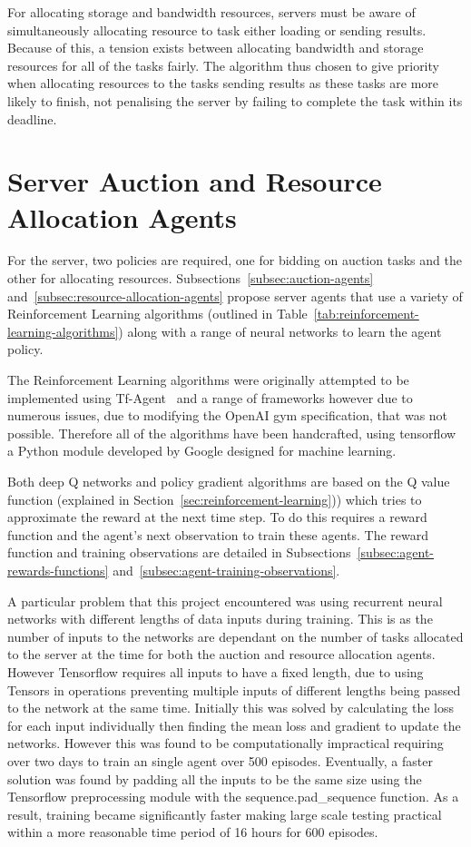 For allocating storage and bandwidth resources, servers must be aware of simultaneously allocating resource to task
either loading or sending results. Because of this, a tension exists between allocating bandwidth and
storage resources for all of the tasks fairly. The algorithm thus chosen to give priority when allocating
resources to the tasks sending results as these tasks are more likely to finish, not penalising the server by failing
to complete the task within its deadline.

\section{Server Auction and Resource Allocation Agents}
\label{sec:server-auction-and-resource-allocation-agents}
For the server, two policies are required, one for bidding on auction tasks and the other for allocating resources.
Subsections~\ref{subsec:auction-agents} and~\ref{subsec:resource-allocation-agents} propose server agents that use
a variety of Reinforcement Learning algorithms (outlined in Table~\ref{tab:reinforcement-learning-algorithms}) along
with a range of neural networks to learn the agent policy.

The Reinforcement Learning algorithms were originally attempted to be implemented using Tf-Agent~\citep{tf-agent} and a
range of frameworks however due to numerous issues, due to modifying the OpenAI gym specification, that was not
possible. Therefore all of the algorithms have been handcrafted, using tensorflow~\citep{tensorflow2015-whitepaper} a
Python module developed by Google designed for machine learning.

Both deep Q networks and policy gradient algorithms are based on the Q value function (explained in
Section~\ref{sec:reinforcement-learning})) which tries to approximate the reward at the next time step. To do
this requires a reward function and the agent's next observation to train these agents. The reward function and training
observations are detailed in Subsections~\ref{subsec:agent-rewards-functions} and~\ref{subsec:agent-training-observations}.

A particular problem that this project encountered was using recurrent neural networks with different lengths of data
inputs during training. This is as the number of inputs to the networks are dependant on the number of tasks allocated
to the server at the time for both the auction and resource allocation agents. However Tensorflow requires all inputs to
have a fixed length, due to using Tensors in operations preventing multiple inputs of different lengths being passed to
the network at the same time.  Initially this was solved by calculating the loss for each input individually
then finding the mean loss and gradient to update the networks. However this was found to be computationally impractical
requiring over two days to train an single agent over 500 episodes. Eventually, a faster solution was found by padding
all the inputs to be the same size using the Tensorflow preprocessing module with the sequence.pad\_sequence function.
As a result, training became significantly faster making large scale testing practical within a more reasonable time
period of 16 hours for 600 episodes.

